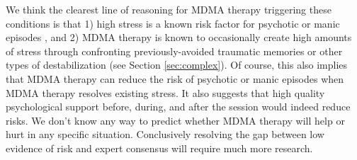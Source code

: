 \documentclass[12pt,letterpaper]{book}
\begin{document}
\begin{itemize}
     We think the clearest line of reasoning for MDMA therapy triggering these conditions is that 1) high stress is a known risk factor for psychotic or manic episodes \cite{winkelPsychosisStress,Umeoka2021stressmania}, and 2) MDMA therapy is known to occasionally create high amounts of stress through confronting previously-avoided traumatic memories or other types of destabilization (see Section \ref{sec:complex}). Of course, this also implies that MDMA therapy can reduce the risk of psychotic or manic episodes when MDMA therapy resolves existing stress. It also suggests that high quality psychological support before, during, and after the session would indeed reduce risks. We don't know any way to predict whether MDMA therapy will help or hurt in any specific situation. Conclusively resolving the gap between low evidence of risk and expert consensus will require much more research.
\end{itemize}
\end{document}
